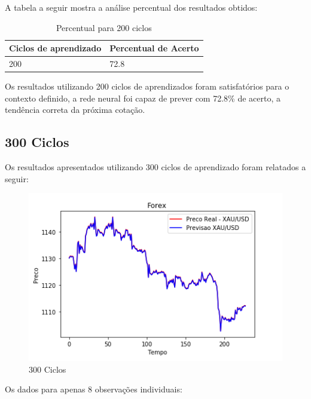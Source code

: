 \pagebreak

A tabela a seguir mostra a análise percentual dos resultados obtidos:

\begin{table}[h]
	\centering
	\caption{Percentual para 200 ciclos}
	\label{tab10}
  \begin{center}
      \begin{tabular}{ | l | p{5cm}}
      \hline
      Ciclos de aprendizado & Percentual de Acerto \\ \hline
		  200 & 72.8 \\ \hline
      \end{tabular}
  \end{center}
\end{table}

Os resultados utilizando 200 ciclos de aprendizados foram satisfatórios para o contexto definido, a rede neural foi capaz de prever
com 72.8\% de acerto, a tendência correta da próxima cotação.

\subsection[300 Ciclos]{300 Ciclos}

Os resultados apresentados utilizando 300 ciclos de aprendizado foram relatados a seguir:

\begin{figure}[h]
	\centering
	\includegraphics[keepaspectratio=true,scale=0.8]{figuras/300high.png}
	\caption{300 Ciclos}
	\label{fig18}
\end{figure}

Os dados para apenas 8 observações individuais:

